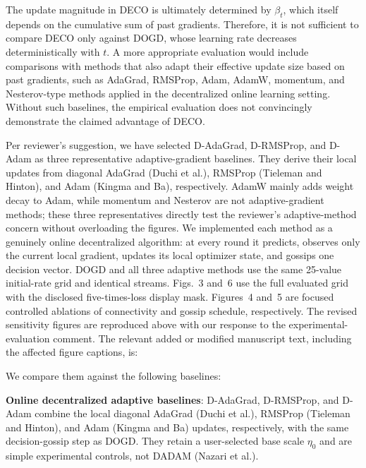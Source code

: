 \documentclass[12pt,english]{reviewresponse}
\begin{document}
\begin{revcomment}
    The update magnitude in DECO is ultimately determined by $\beta_t$, which itself depends on the cumulative sum of past gradients. Therefore, it is not sufficient to compare DECO only against DOGD, whose learning rate decreases deterministically with $t$. A more appropriate evaluation would include comparisons with methods that also adapt their effective update size based on past gradients, such as AdaGrad, RMSProp, Adam, AdamW, momentum, and Nesterov-type methods applied in the decentralized online learning setting. Without such baselines, the empirical evaluation does not convincingly demonstrate the claimed advantage of DECO.\@
\end{revcomment}
\begin{revresponse}
    Per reviewer's suggestion, we have selected D-AdaGrad, D-RMSProp, and D-Adam as three representative adaptive-gradient baselines.  They derive their local updates from diagonal AdaGrad (Duchi et al.), RMSProp (Tieleman and Hinton), and Adam (Kingma and Ba), respectively.  AdamW mainly adds weight decay to Adam, while momentum and Nesterov are not adaptive-gradient methods; these three representatives directly test the reviewer's adaptive-method concern without overloading the figures.
    We implemented each method as a genuinely online decentralized algorithm: at every round it predicts, observes only the current local gradient, updates its local optimizer state, and gossips one decision vector. DOGD and all three adaptive methods use the same 25-value initial-rate grid and identical streams. Figs.~3 and~6 use the full evaluated grid with the disclosed five-times-loss display mask. Figures~4 and~5 are focused controlled ablations of connectivity and gossip schedule, respectively.
    The revised sensitivity figures are reproduced above with our response to the experimental-evaluation comment.
    The relevant added or modified manuscript text, including the affected figure captions, is:
    \begin{changes}
        We compare them against the following baselines:

        \textbf{Online decentralized adaptive baselines}: D-AdaGrad, D-RMSProp, and D-Adam combine the local diagonal AdaGrad (Duchi et al.), RMSProp (Tieleman and Hinton), and Adam (Kingma and Ba) updates, respectively, with the same decision-gossip step as DOGD\@. They retain a user-selected base scale $\eta_0$ and are simple experimental controls, not DADAM (Nazari et al.).


\end{changes}
\end{revresponse}
\end{document}
